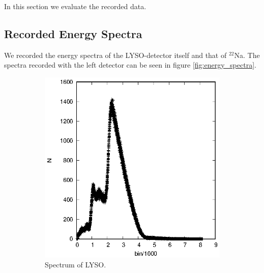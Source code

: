 In this section we evaluate the recorded data.
\subsection{Recorded Energy Spectra}
We recorded the energy spectra of the LYSO-detector itself and that of $^{22}$Na. The spectra recorded with the left detector can be seen in figure \ref{fig:energy_spectra}.

\newpage

\begin{figure}[h]
  \centering
  \begin{subfigure}[h]{0.49\textwidth}
    \centering
    \includegraphics[width=\textwidth]{evaluation_kilian/energy_spectra/links_LYSO.eps}
    \caption{Spectrum of LYSO.}
  \end{subfigure}%
  \begin{subfigure}[h]{0.49\textwidth}
    \centering

\end{subfigure}
\end{figure}
